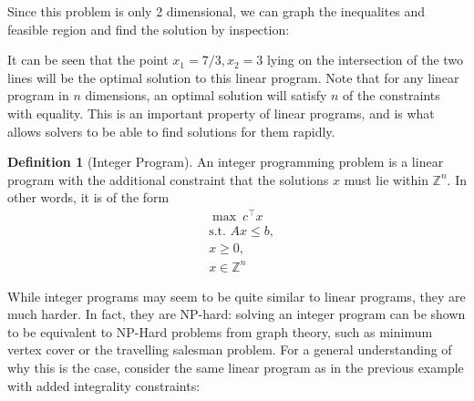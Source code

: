 \documentclass[11pt]{article} %
\theoremstyle{definition}
\newtheorem{definition}[theorem]{Definition}
\theoremstyle{remark}
\newcommand{\ZZ}{\mathbb{Z}}
\begin{document}
Since this problem is only 2 dimensional, we can graph the inequalites and feasible region and find the solution by inspection:
\begin{figure}[h]
\centering
{}
\end{figure}

It can be seen that the point $x_1 = 7/3, x_2 = 3$ lying on the intersection of the two lines will be the optimal solution to this linear program. Note that for any linear program in $n$ dimensions, an optimal solution will satisfy $n$ of the constraints with equality. This is an important property of linear programs, and is what allows solvers to be able to find solutions for them rapidly.

\begin{definition}[Integer Program]
An integer programming problem is a linear program with the additional constraint that the solutions $x$ must lie within $\ZZ^n$. In other words, it is of the form
\begin{align*}
&\max{} \ c^\intercal x \\
&\textrm{s.t. } Ax \leq b, \\
& x \geq 0, \\
& x \in \ZZ^n
\end{align*}
\end{definition}

While integer programs may seem to be quite similar to linear programs, they are much harder. In fact, they are NP-hard: solving an integer program can be shown to be equivalent to NP-Hard problems from graph theory, such as minimum vertex cover or the travelling salesman problem. For a general understanding of why this is the case, consider the same linear program as in the previous example with added integrality constraints:
\begin{figure}[h]
\centering
{}
\end{figure}
\end{document}
